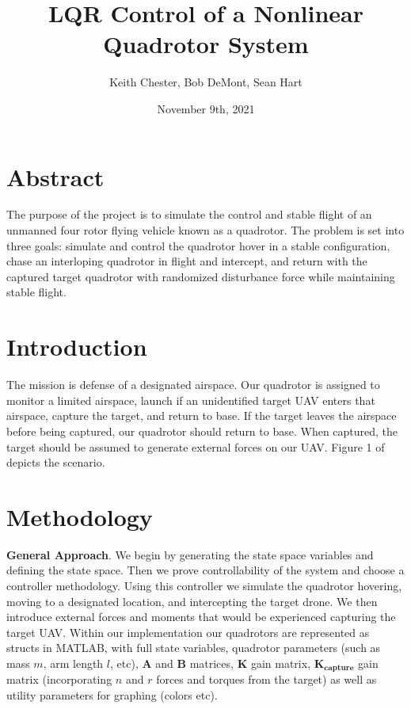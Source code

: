 \documentclass{article}
\title{LQR Control of a Nonlinear Quadrotor System}
\author{Keith Chester, Bob DeMont, Sean Hart}
\date{November 9th, 2021}
\begin{document}
\maketitle


\begin{multicols}{2}
\section*{Abstract}
The purpose of the project is to simulate the control and stable flight of an unmanned four rotor flying vehicle known as a quadrotor.  The problem is set into three goals: simulate and control the quadrotor hover in a stable configuration, chase an interloping quadrotor in flight and intercept, and return with the captured target quadrotor with randomized disturbance force while maintaining stable flight.

\section*{Introduction}
The mission is defense of a designated airspace.  Our quadrotor is assigned to monitor a limited airspace, launch if an unidentified 
target UAV enters that airspace, capture the target, and return to base. If the target leaves the airspace before being captured, our 
quadrotor should return to base.  When captured, the target should be assumed to generate external forces on our UAV.  Figure 1 of \cite{FaalP} depicts the scenario.

\section*{Methodology}

\textbf{General Approach}. We begin by generating the state space variables and defining the state space. Then we prove 
controllability of the system and choose a controller methodology.  Using this controller we simulate the quadrotor hovering, moving to a designated location, and intercepting the target drone.  We then introduce external forces and moments that would be experienced capturing the target UAV. Within our implementation our quadrotors are represented as structs in MATLAB, with full state variables, quadrotor parameters (such as mass $m$, arm length $l$, etc), $\boldsymbol{A}$ and $\boldsymbol{B}$ matrices, $\boldsymbol{K}$ gain matrix, $\boldsymbol{K_{capture}}$ gain matrix (incorporating $n$ and $r$ forces and torques from the target) as well as utility parameters for graphing (colors etc).


\end{multicols}
\end{document}
